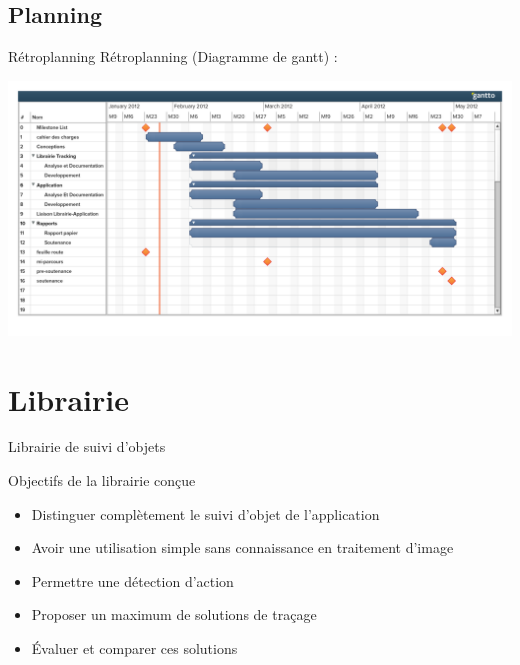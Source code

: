 \documentclass{beamer}
\begin{document}
	\subsection{Planning}
		\begin{frame}{Rétroplanning}	
			Rétroplanning (Diagramme de gantt) :
			\begin{center}
			\includegraphics[scale=0.25]{../feuille-route/retroplanning.pdf}
			\end{center}
		\end{frame}
	
	\section{Librairie}
		\begin{frame}{Librairie de suivi d'objets}
			\begin{block}{Objectifs de la librairie conçue}
				\begin{itemize}
				\item{Distinguer complètement le suivi d'objet de l'application}
				\item{Avoir une utilisation simple sans connaissance en traitement d'image}
				\item{Permettre une détection d'action}
				\item{Proposer un maximum de solutions de traçage}
				\item{Évaluer et comparer ces solutions}
				\end{itemize}
			\end{block}
		\end{frame}
\end{document}
